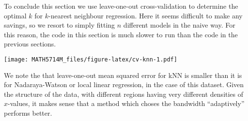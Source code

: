 \documentclass[
  a4paper,
]{article}
\newenvironment{Shaded}{\begin{snugshade}}{\end{snugshade}}
\newcommand{\AttributeTok}[1]{\textcolor[rgb]{0.77,0.63,0.00}{#1}}
\newcommand{\ControlFlowTok}[1]{\textcolor[rgb]{0.13,0.29,0.53}{\textbf{#1}}}
\newcommand{\DecValTok}[1]{\textcolor[rgb]{0.00,0.00,0.81}{#1}}
\newcommand{\FunctionTok}[1]{\textcolor[rgb]{0.00,0.00,0.00}{#1}}
\newcommand{\NormalTok}[1]{#1}
\newcommand{\OtherTok}[1]{\textcolor[rgb]{0.56,0.35,0.01}{#1}}
\newcommand{\SpecialCharTok}[1]{\textcolor[rgb]{0.00,0.00,0.00}{#1}}
\newcommand{\StringTok}[1]{\textcolor[rgb]{0.31,0.60,0.02}{#1}}
\theoremstyle{definition}
\theoremstyle{definition}
\theoremstyle{definition}
\theoremstyle{definition}
\theoremstyle{remark}
\begin{document}
To conclude this section we use leave-one-out cross-validation to determine the
optimal \(k\) for \(k\)-nearest neighbour regression. Here it seems difficult to
make any savings, so we resort to simply fitting \(n\) different models in the
naive way. For this reason, the code in this section is much slower to
run than the code in the previous sections.

\begin{Shaded}
\end{Shaded}

\texttt{[image: MATH5714M\_files/figure-latex/cv-knn-1.pdf]}

We note the that leave-one-out mean squared error for kNN is smaller
than it is for Nadaraya-Watson or local linear regression, in the
case of this dataset. Given
the structure of the data, with different regions having very different
densities of \(x\)-values, it makes sense that a method which choses
the bandwidth ``adaptively'' performs better.
\end{document}
